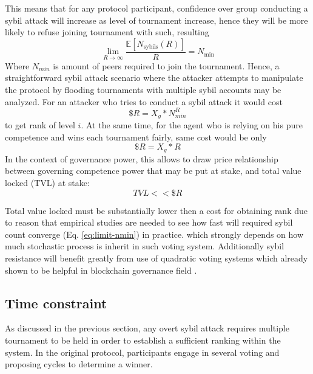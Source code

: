 \documentclass{article}
\begin{document}
\begin{CJK}{UTF8}{gbsn}
\begin{multicols}{2}
            This means that for any protocol participant, confidence over group conducting a sybil attack will increase as level of tournament increase, hence they will be more likely to refuse joining tournament with such, resulting
            \begin{equation}
                \lim_{R \to \infty} \frac{\mathbb{E}[N_{\text{sybils}}(R)]}{R} = N_{\text{min}}
                \label{eq:limit-nmin}
            \end{equation} Where $N_{min}$ is amount of peers required to join the tournament. Hence, a straightforward sybil attack scenario where the attacker attempts to manipulate the protocol by flooding tournaments with multiple sybil accounts may be analyzed.
            For an attacker who tries to conduct a sybil attack it would cost
            \begin{equation}
                \$R = X_g*N_{min}^R
            \end{equation}
            to get rank of level $i$. At the same time, for the agent who is relying on his pure competence and wins each tournament fairly, same cost would be only \begin{equation}
                \$R = X_g*R
            \end{equation}
            In the context of governance power, this allows to draw price relationship between governing competence power that may be put at stake, and total value locked (TVL) at stake:
            \begin{equation}
                TVL << \$R
            \end{equation}

            Total value locked must be substantially lower then a cost for obtaining rank due to reason that empirical studies are needed to see how fast will required sybil count converge (Eq. \ref{eq:limit-nmin}) in practice. which strongly depends on how much stochastic process is inherit in such voting system. Additionally sybil resistance will benefit greatly from use of quadratic voting systems which already shown to be helpful in blockchain governance field \cite{Buterin20}\cite{Benhaim2024}.


            \subsection{Time constraint}
            \label{sec:time-constraint}

            As discussed in the previous section, any overt sybil attack requires multiple tournament to be held in order to establish a sufficient ranking within the system. In the original protocol, participants engage in several voting and proposing cycles to determine a winner.


\end{multicols}
\end{CJK}
\end{document}
